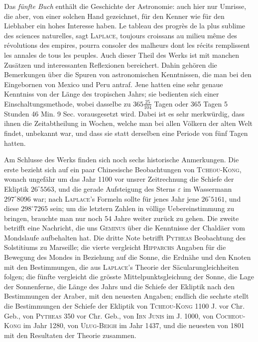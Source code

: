 Das \emph{fünfte Buch} enthält die Geschichte der Astronomie: auch hier nur Umrisse, die aber, von einer solchen Hand gezeichnet, für den Kenner wie für den Liebhaber ein hohes Interesse haben. Le tableau des progrès de la plus sublime des sciences naturelles, sagt \textsc{Laplace}, toujours croissans au milieu même des révolutions des empires, pourra consoler des malheurs dont les récits remplissent les annales de tous les peuples. Auch dieser Theil des Werks ist mit manchen Zusätzen und interessanten Reflexionen bereichert. Dahin gehören die Bemerkungen über die Spuren von astronomischen Kenntnissen, die man bei den Eingebornen von Mexico und Peru antraf. Jene hatten eine sehr genaue Kenntniss von der Länge des tropischen Jahrs; sie bedienten sich einer Einschaltungsmethode, wobei dasselbe zu $365\frac{25}{104}$ Tagen oder 365 Tagen 5 Stunden 46 Min. 9 Sec. vorausgesetzt wird. Dabei ist es sehr merkwürdig, dass ihnen die Zeitabtheilung in Wochen, welche man bei allen Völkern der alten Welt findet, unbekannt war, und dass sie statt derselben eine Periode von fünf Tagen hatten.

Am Schlusse des Werks finden sich noch sechs historische Anmerkungen. Die erste bezieht sich auf ein paar Chinesische Beobachtungen von \textsc{Tcheou-Kong}, wonach ungefähr um das Jahr 1100 vor unsrer Zeitrechnung die Schiefe der Ekliptik $26^{\circ}5563$, und die gerade Aufsteigung des Sterns $\varepsilon$ im Wassermann $297^{\circ}8096$ war; nach \textsc{Laplace}'s Formeln sollte für jenes Jahr jene $26^{\circ}5161$, und diese $298^{\circ}7265$ sein; um die letztern Zahlen in völlige Uebereinstimmung zu bringen, brauchte man nur noch 54 Jahre weiter zurück zu gehen. Die zweite betrifft eine Nachricht, die uns \textsc{Geminus} über die Kenntnisse der Chaldäer vom Mondslaufe aufbehalten hat. Die dritte Note betrifft \textsc{Pytheas} Beobachtung des Solstitiums zu Marseille; die vierte vergleicht \textsc{Hipparchs} Angaben für die Bewegung des Mondes in Beziehung auf die Sonne, die Erdnähe und den Knoten mit den Bestimmungen, die aus \textsc{Laplace}'s Theorie der Säcularungleichheiten folgen; die fünfte vergleicht die grösste Mittelpunktsgleichung der Sonne, die Lage der Sonnenferne, die Länge des Jahrs und die Schiefe der Ekliptik nach den Bestimmungen der Araber, mit den neuesten Angaben; endlich die sechste stellt die Bestimmungen der Schiefe der Ekliptik von \textsc{Tcheou-Kong} 1100 J. vor Chr. Geb., von \textsc{Pytheas} 350 vor Chr. Geb., von \textsc{Ibn Junis} im J. 1000, von \textsc{Cocheou-Kong} im Jahr 1280, von \textsc{Ulug-Beigh} im Jahr 1437, und die neuesten von 1801 mit den Resultaten der Theorie zusammen.
